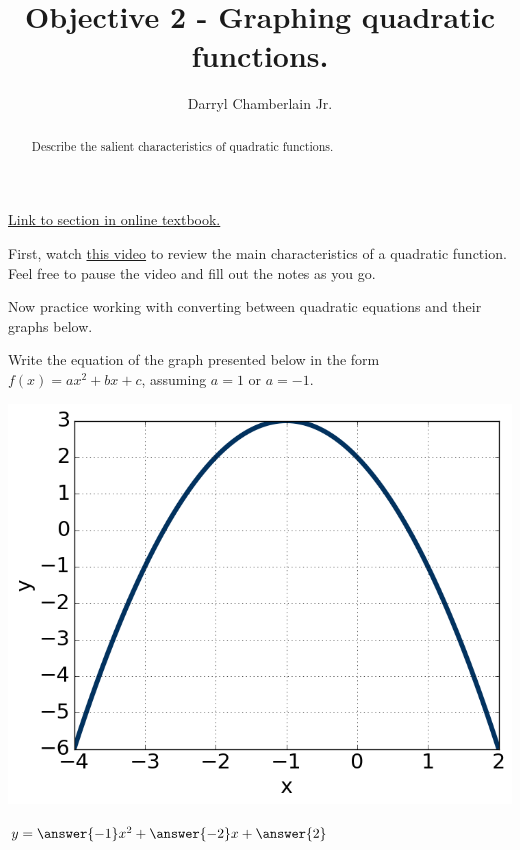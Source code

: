 \documentclass{ximera}
\author{Darryl Chamberlain Jr.}
\title{Objective 2 - Graphing quadratic functions.}
\begin{document}
\begin{abstract}
Describe the salient characteristics of quadratic functions.
\end{abstract}
\maketitle

\href{https://cnx.org/contents/mwjClAV_@8.1:-Sm9he1Q@17/Quadratic-Functions}{Link to section in online textbook.}


First, watch 
\href{https://mediasite.video.ufl.edu/Mediasite/Play/b3664c4b8bbb458a969fecac7a80759c1d}{this video} to review the main characteristics of a quadratic function. Feel free to pause the video and fill out the notes as you go. 

Now practice working with converting between quadratic equations and their graphs below. 

\begin{question}
Write the equation of the graph presented below in the form $f(x)=ax^2+bx+c$, assuming $a=1$ or $a=-1$. 

\begin{center}
	\includegraphics{question1Astatic.png}
\end{center}
$y = \answer{-1} x^2 + \answer{-2} x + \answer{2}$
\end{question}
\end{document}
